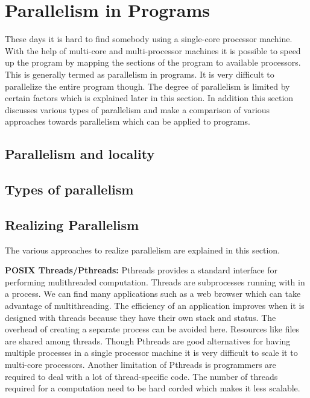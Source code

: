 \label{chap:background}

\section{Parallelism in Programs}
These days it is hard to find somebody using a single-core processor machine.
With the help of multi-core and multi-processor machines it is possible to speed up 
the program by mapping the sections of the program to available processors. This 
is generally termed as parallelism in programs. It is very difficult to parallelize
the entire program though. The degree of parallelism is limited by certain factors which is
explained later in this section. In addition this section discusses various types of parallelism and
make a comparison of various approaches towards parallelism which can be applied to programs.

\subsection{Parallelism and locality}

\subsection{Types of parallelism}

\subsection{Realizing Parallelism}

The various approaches to realize parallelism are explained in this section.

\textbf{POSIX Threads/Pthreads:} Pthreads provides a standard interface for performing mulithreaded computation. 
Threads are subprocesses running with in a process. 
We can find many applications such as a web browser which can take advantage of multithreading.
The efficiency of an application improves when it is designed with threads because they have their
own stack and status. The overhead of creating a separate process can be avoided here.
Resources like files are shared among threads. Though Pthreads are good alternatives for
having multiple processes in a single processor machine it is very difficult to scale
it to multi-core processors. Another limitation of Pthreads is programmers are required to
deal with a lot of thread-specific code. The number of threads required for a computation
need to be hard corded which makes it less scalable.

